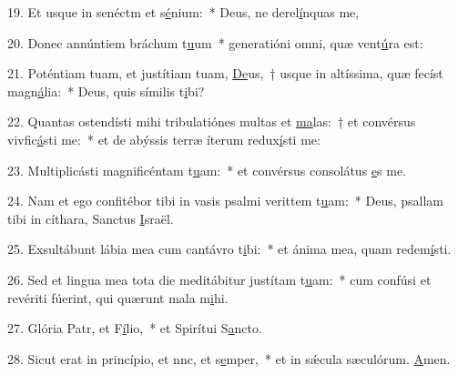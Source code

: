 19. Et usque in senéctm et s\uline{é}nium:~* Deus, ne derel\uline{í}nquas me,\par 
20. Donec annúntiem bráchum t\uline{u}um~* generatióni omni, quæ vent\uline{ú}ra est:\par 
21. Poténtiam tuam, et justítiam tuam, \uline{De}us,~† usque in altíssima, quæ fecíst magn\uline{á}lia:~* Deus, quis símilis t\uline{i}bi?\par 
22. Quantas ostendísti mihi tribulatiónes multas et \uline{ma}las:~† et convérsus vivfic\uline{á}sti me:~* et de abýssis terræ íterum redux\uline{í}sti me:\par 
23. Multiplicásti magnificéntam t\uline{u}am:~* et convérsus consolátus \uline{e}s me.\par 
24. Nam et ego confitébor tibi in vasis psalmi verittem t\uline{u}am:~* Deus, psallam tibi in cíthara, Sanctus \uline{I}sraël.\par 
25. Exsultábunt lábia mea cum cantávro t\uline{i}bi:~* et ánima mea, quam redem\uline{í}sti.\par 
26. Sed et lingua mea tota die meditábitur justítam t\uline{u}am:~* cum confúsi et revériti fúerint, qui quærunt mala m\uline{i}hi.\par 
27. Glória Patr, et F\uline{í}lio,~* et Spirítui S\uline{a}ncto.\par 
28. Sicut erat in princípio, et nnc, et s\uline{e}mper,~* et in sǽcula sæculórum. \uline{A}men.\par 
